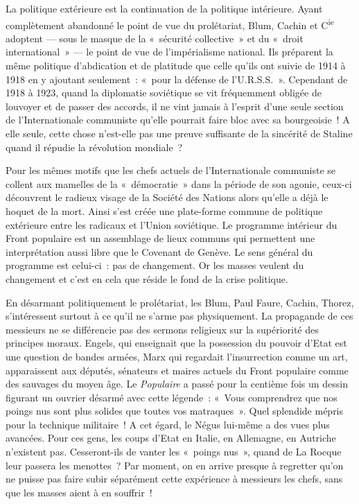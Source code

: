 \documentclass[french,twoside]{book} %
\begin{document}
La politique extérieure est la continuation de la politique intérieure. Ayant complètement abandonné le point de vue du prolétariat, Blum, Cachin et C\textsuperscript{ie} adoptent — sous le masque de la « sécurité collective » et du « droit international » — le point de vue de l’impérialisme national. Ils préparent la même politique d’abdication et de platitude que celle qu’ils ont suivie de 1914 à 1918 en y ajoutant seulement : « pour la défense de l’U.R.S.S. ». Cependant de 1918 à 1923, quand la diplomatie soviétique se vit fréquemment obligée de louvoyer et de passer des accords, il ne vint jamais à l’esprit d’une seule section de l’Internationale communiste qu’elle pourrait faire bloc avec sa bourgeoisie ! A elle seule, cette chose n’est-elle pas une preuve suffisante de la sincérité de Staline quand il répudie la révolution mondiale ?\par
Pour les mêmes motifs que les chefs actuels de l’Internationale communiste se collent aux mamelles de la « démocratie » dans la période de son agonie, ceux-ci découvrent le radieux visage de la Société des Nations alors qu’elle a déjà le hoquet de la mort. Ainsi s’est créée une plate-forme commune de politique extérieure entre les radicaux et l’Union soviétique. Le programme intérieur du Front populaire est un assemblage de lieux communs qui permettent une interprétation aussi libre que le Covenant de Genève. Le sens général du programme est celui-ci : pas de changement. Or les masses veulent du changement et c’est en cela que réside le fond de la crise politique.\par
En désarmant politiquement le prolétariat, les Blum, Paul Faure, Cachin, Thorez, s’intéressent surtout à ce qu’il ne s’arme pas physiquement. La propagande de ces messieurs ne se différencie pas des sermons religieux sur  la supériorité des principes moraux. Engels, qui enseignait que la possession du pouvoir d’Etat est une question de bandes armées, Marx qui regardait l’insurrection comme un art, apparaissent aux députés, sénateurs et maires actuels du Front populaire comme des sauvages du moyen âge. Le \emph{Populaire} a passé pour la centième fois un dessin figurant un ouvrier désarmé avec cette légende : « Vous comprendrez que nos poings nus sont plus solides que toutes vos matraques ». Quel splendide mépris pour la technique militaire ! A cet égard, le Négus lui-même a des vues plus avancées. Pour ces gens, les coups d’Etat en Italie, en Allemagne, en Autriche n’existent pas. Cesseront-ils de vanter les « poings nus », quand de La Rocque leur passera les menottes ? Par moment, on en arrive presque à regretter qu’on ne puisse pas faire subir séparément cette expérience à messieurs les chefs, sans que les masses aient à en souffrir !\par
\end{document}

